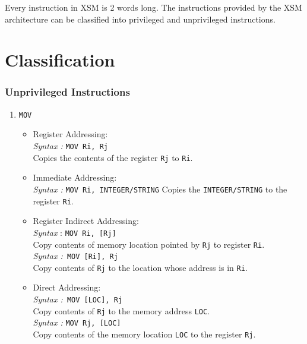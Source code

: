 \documentclass[11pt]{report}
\begin{document}
Every instruction in XSM is 2 words long. The instructions provided by the XSM architecture can be classified into privileged and unprivileged instructions. 

\section{Classification}

\subsubsection{Unprivileged Instructions}


\begin{enumerate}
\item \texttt{MOV}
\begin{itemize}

\item Register Addressing:\\
\textit{Syntax :} \texttt{MOV Ri, Rj}\\
Copies the contents of the register \texttt{Rj} to \texttt{Ri}.

\item Immediate Addressing:\\
\textit{Syntax :} \texttt{MOV Ri, INTEGER/STRING}
Copies the \texttt{INTEGER/STRING} to the register \texttt{Ri}.


\item Register Indirect Addressing:\\
\textit{Syntax }: \texttt{MOV Ri, [Rj]}\\
Copy contents of memory location pointed by \texttt{Rj} to register \texttt{Ri}.\\
\textit{Syntax :}\texttt{ MOV [Ri], Rj} \\
Copy contents of \texttt{Rj} to the location whose address is in \texttt{Ri}.


\item Direct Addressing:\\
\textit{Syntax :}\texttt{ MOV [LOC], Rj}\\
Copy contents of \texttt{Rj}  to the memory address \texttt{LOC}.\\
\textit{Syntax :} \texttt{MOV Rj, [LOC]}\\
Copy contents of the memory location \texttt{LOC} to the register \texttt{Rj}.


\end{itemize}
\end{enumerate}
\end{document}
